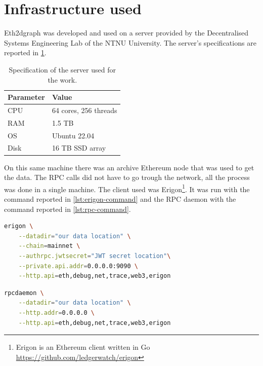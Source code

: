 

\section{Infrastructure used}

Eth2dgraph was developed and used on a server provided by the Decentralised Systems Engineering Lab of the NTNU University. The server's specifications are reported in \cref{table:server-specs}.

\begin{table}[ht!]
\centering
    \begin{threeparttable}
    \begin{tabular}  { m{3cm} m{6cm} } 
    \toprule
    \textbf{Parameter} & \textbf{Value}   \\
    \midrule
    CPU    &    64 cores, 256 threads \\[1.3ex]
    RAM    &    1.5 TB \\[1.3ex]
    OS    &     Ubuntu 22.04 \\[1.3ex]
    Disk    &   16 TB SSD array \\[1.3ex]
    \bottomrule
    \end{tabular}
    \end{threeparttable}
\caption[Specification of the server used for the work]{Specification of the server used for the work.}
\label{table:server-specs}
\end{table}

On this same machine there was an archive Ethereum node that was used to get the data. The RPC calls did not have to go trough the network, all the process was done in a single machine. The client used was Erigon\footnote{Erigon is an Ethereum client written in Go \url{https://github.com/ledgerwatch/erigon}}. It was run with the command reported in \cref{lst:erigon-command} and the RPC daemon with the command reported in \cref{lst:rpc-command}.

\begin{lstlisting}[language=bash,caption={Erigon command},label={lst:erigon-command},captionpos=b,numbers=none]
erigon \
    --datadir="our data location" \
    --chain=mainnet \
    --authrpc.jwtsecret="JWT secret location"\
    --private.api.addr=0.0.0.0:9090 \
    --http.api=eth,debug,net,trace,web3,erigon
\end{lstlisting}

\begin{lstlisting}[language=bash,caption={RPC daemon command},label={lst:rpc-command},captionpos=b,numbers=none]
rpcdaemon \
    --datadir="our data location" \
    --http.addr=0.0.0.0 \
    --http.api=eth,debug,net,trace,web3,erigon
\end{lstlisting}

